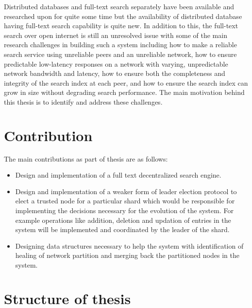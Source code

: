 \documentclass[a4paper,11pt]{kth-mag}
\begin{document}
Distributed databases and full-text search separately have been available and researched upon for quite some time but the availability of distributed database having full-text search capability is quite new. In addition to this, the full-text search over open internet is still an unresolved issue with some of the main research challenges in building such a system including how to make a reliable search service using unreliable peers and an unreliable network, how to ensure predictable low-latency responses on a network with varying, unpredictable network bandwidth and latency, how to ensure both the completeness and integrity of the search index at each peer, and how to ensure the search index can grow in size without degrading search performance. The main motivation behind this thesis is to identify and address these challenges.



\section{Contribution}
\label{sec: contribution}

The main contributions as part of thesis are as follows:

\begin{itemize}
	\item Design and implementation of a full text decentralized search engine.
	\item Design and implementation of a weaker form of leader election protocol to elect a trusted node for a particular shard which would be responsible for implementing the decisions necessary for the evolution of the system. For example operations like addition, deletion and updation of entries in the system will be implemented and coordinated by the leader of the shard.
	\item Designing data structures necessary to help the system with identification of healing of network partition and merging back the partitioned nodes in the system.

\end{itemize}



\section{Structure of thesis}
\label{sec:thesis_structure}
\end{document}
